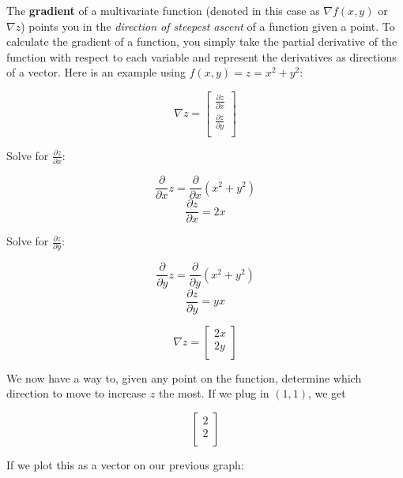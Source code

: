     The \textbf{gradient} of a multivariate function (denoted in this case as $\nabla f(x,y)$ or $\nabla z$) points you in the \textit{direction of steepest ascent} of a function given a point. To calculate the gradient of a function, you simply take the partial derivative of the function with respect to each variable and represent the derivatives as directions of a vector. Here is an example using $f(x,y) = z = x^2 + y^2$:

    $$\nabla z = \begin{bmatrix}
            \frac{\partial z}{\partial x}\\
            \frac{\partial z}{\partial y}\\
            \end{bmatrix}$$

    Solve for $\frac{\partial z}{\partial x}$:

    $$\frac{\partial}{\partial x}z = \frac{\partial}{\partial x}(x^2 + y^2)$$
    $$\frac{\partial z}{\partial x} = 2x$$

    Solve for $\frac{\partial z}{\partial y}$:
    
    $$\frac{\partial}{\partial y}z = \frac{\partial}{\partial y}(x^2 + y^2)$$
    $$\frac{\partial z}{\partial y} = yx$$

    $$\nabla z = \begin{bmatrix}
            2x\\
            2y\\
            \end{bmatrix}$$

    We now have a way to, given any point on the function, determine which direction to move to increase $z$ the most. If we plug in $(1,1)$, we get 
    
    $$\begin{bmatrix}
            2\\
            2\\
    \end{bmatrix}$$

    If we plot this as a vector on our previous graph:

